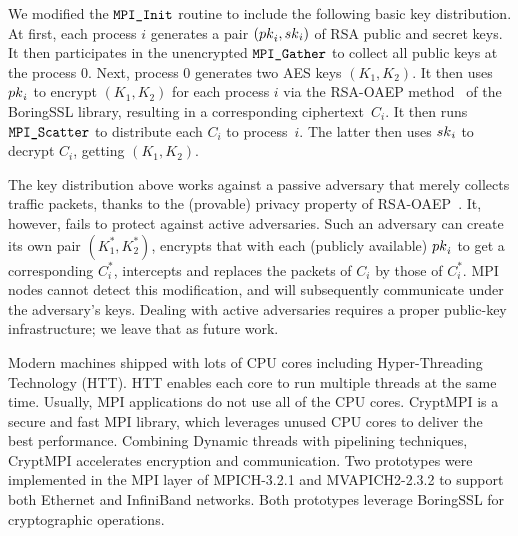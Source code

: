  We modified the $\texttt{MPI\_Init}$ routine to include the following basic key distribution. 
At first, each process $i$ generates a pair $({pk}_i, {sk}_i)$ of RSA public and secret keys. 
It then participates in the unencrypted $\texttt{MPI\_Gather}$ to collect all public keys at the process $0$. 
Next, process $0$ generates two AES keys $(K_1, K_2)$. 
It then uses ${pk}_i$ to encrypt $(K_1, K_2)$ for each process $i$ via  the RSA-OAEP method~\cite{OAEP} of the BoringSSL library, 
resulting in a corresponding ciphertext~$C_i$. 
It then runs $\texttt{MPI\_Scatter}$ to distribute each $C_i$ to process~$i$. 
The latter then uses ${sk}_i$ to decrypt $C_i$, getting $(K_1, K_2)$. 


The key distribution above works against a passive adversary that merely collects traffic packets, 
thanks to the (provable) privacy property of RSA-OAEP~\cite{OAEP}.
It, however, fails to protect against active adversaries. 
Such an adversary can create its own pair $(K^*_1, K^*_2)$, 
encrypts that with each (publicly available) ${pk}_i$ to get a corresponding $C^*_i$, intercepts and replaces the packets
of $C_i$ by those of $C^*_i$. 
MPI nodes cannot detect this modification, and will subsequently communicate under the adversary's keys. 
Dealing with active adversaries requires a proper public-key infrastructure; 
we leave that as future work. 

\iffalse

Modern machines shipped with lots of CPU cores including Hyper-Threading 
Technology (HTT). HTT enables each core to run multiple threads at the
same time. Usually, MPI applications do not use all of the CPU cores. 
CryptMPI is a secure and fast MPI library, which leverages unused CPU 
cores to deliver the best performance. Combining Dynamic threads with 
pipelining techniques, CryptMPI accelerates encryption and communication.
Two prototypes were implemented in the MPI layer of MPICH-3.2.1 and 
MVAPICH2-2.3.2 to support both Ethernet and InfiniBand networks. Both prototypes 
leverage BoringSSL for cryptographic operations. 


